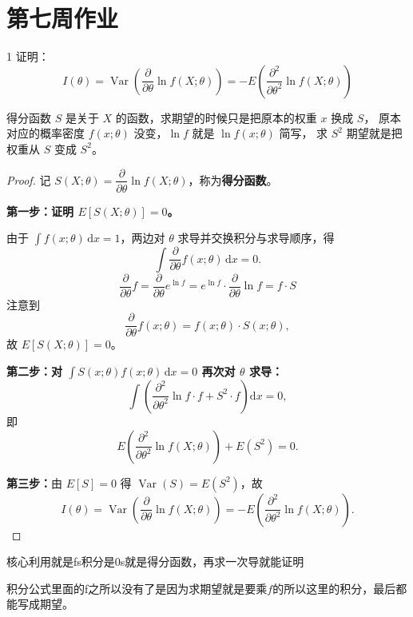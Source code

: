 \section{第七周作业}
\begin{homework}{1}
证明：
\[
I(\theta) = \operatorname{Var}\left(\frac{\partial}{\partial\theta}\ln f(X;\theta)\right) = -E\left(\frac{\partial^2}{\partial\theta^2}\ln f(X;\theta)\right)
\]
\end{homework}
\begin{dxtips}
得分函数 $S$ 是关于 $X$ 的函数，求期望的时候只是把原本的权重 $x$ 换成 $S$，
原本对应的概率密度 $f(x;\theta)$ 没变，$\ln f$ 就是 $\ln f(x;\theta)$ 简写，
求 $S^2$ 期望就是把权重从 $S$ 变成 $S^2$。
\end{dxtips}
\begin{proof}
记 $S(X;\theta) = \dfrac{\partial}{\partial\theta}\ln f(X;\theta)$，称为\textbf{得分函数}。

\textbf{第一步：证明 $E[S(X;\theta)] = 0$。}

由于 $\displaystyle\int f(x;\theta)\,\mathrm{d}x = 1$，两边对 $\theta$ 求导并交换积分与求导顺序，得
\[
\int \frac{\partial}{\partial\theta} f(x;\theta)\,\mathrm{d}x = 0.
\]
$$\frac{\partial}{\partial\theta}f 
= \frac{\partial}{\partial\theta}e^{\ln f} 
= e^{\ln f}\cdot\frac{\partial}{\partial\theta}\ln f 
= f\cdot S$$
注意到
\[
\frac{\partial}{\partial\theta} f(x;\theta) = f(x;\theta)\cdot S(x;\theta),
\]
故 $E[S(X;\theta)] = 0$。

\textbf{第二步：对 $\displaystyle\int S(x;\theta) f(x;\theta)\,\mathrm{d}x = 0$ 再次对 $\theta$ 求导：}
\[
\int \left(\frac{\partial^2}{\partial\theta^2}\ln f\cdot f + S^2\cdot f\right)\mathrm{d}x = 0,
\]
即
\[
E\left(\frac{\partial^2}{\partial\theta^2}\ln f(X;\theta)\right) + E\left(S^2\right) = 0.
\]

\textbf{第三步：}由 $E[S]=0$ 得 $\operatorname{Var}(S) = E(S^2)$，故
\[
I(\theta) = \operatorname{Var}\left(\frac{\partial}{\partial\theta}\ln f(X;\theta)\right) = -E\left(\frac{\partial^2}{\partial\theta^2}\ln f(X;\theta)\right).
\]
\end{proof}
\begin{dxtips}
    核心利用就是fs积分是0s就是得分函数，再求一次导就能证明
\end{dxtips}
\begin{dxtips}
    积分公式里面的f之所以没有了是因为求期望就是要乘$f$的所以这里的积分，最后都能写成期望。
\end{dxtips}
